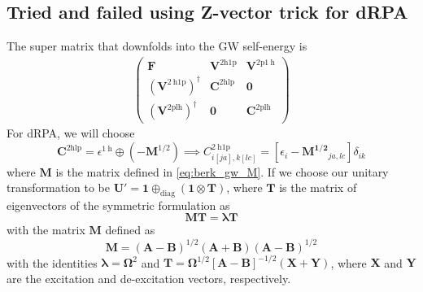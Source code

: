 \subsection{Tried and failed using Z-vector trick for dRPA}
The super matrix that downfolds into the GW self-energy is
\begin{align}
\begin{pmatrix} \bm{F} & \bm{V}^{2 \mathrm{h1p}} & \bm{V}^{2 \mathrm{p} 1 \mathrm{~h}} \\ \left(\bm{V}^{2 \mathrm{~h} 1 \mathrm{p}}\right)^{\dagger} & \bm{C}^{2 \mathrm{hlp}} & \bm{0} \\ \left(\bm{V}^{2 \mathrm{plh}}\right)^{\dagger} & \bm{0} & \bm{C}^{2 \mathrm{plh}} \end{pmatrix}
\end{align}
For dRPA, we will choose 
\begin{equation}
    \bm{C}^{2 \mathrm{hlp}} = \epsilon^{1 \mathrm{~h}} \oplus (-\bm{M}^{1/2})
\implies C_{i[j a], k[l c]}^{2 \mathrm{~h} 1 \mathrm{p}} = \left[\epsilon _i - \bm{M^{1/2}}_{ja,lc}\right] \delta_{i k}
\end{equation}
 where $\bm{M}$ is the matrix defined in \eqref{eq:berk_gw_M}.
If we choose our unitary transformation to be $\bm{U'} = \bm{1} \oplus_{\text{diag}} \left(\bm{1}\otimes \bm{T}\right)$, where $\bm{T}$ is the matrix of eigenvectors of the symmetric formulation as 
\begin{equation}
    \bm{M}\bm{T}= \bm{\lambda } \bm{T}
\label{eq:berk_gw_eigenproblem}
\end{equation}
with the matrix $\bm{M}$ defined as
\begin{equation}
    \bm{M}=(\bm{A}-\bm{B})^{1 / 2}(\bm{A}+\bm{B})(\bm{A}-\bm{B})^{1 / 2}
\label{eq:berk_gw_M}
\end{equation}
with the identities $\bm{\lambda } = \bm{\Omega }^2$ and $\bm{T} = \bm{\Omega }^{1/2} \left[\bm{A}-\bm{B}\right]^{-1/2}\left(\bm{X} + \bm{Y}\right)$, where $\bm{X}$ and $\bm{Y}$ are the excitation and de-excitation vectors, respectively. 
